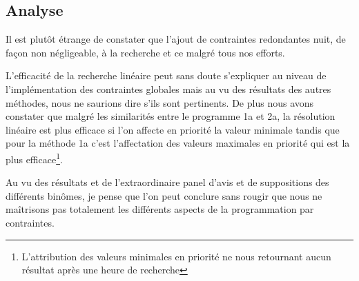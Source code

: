 \documentclass[a4paper, 11pt]{article}
\begin{document}
\subsection{Analyse}
Il est plutôt étrange de constater que l'ajout de contraintes redondantes nuit, de façon non négligeable, à la recherche et ce malgré tous nos efforts.

L'efficacité de la recherche linéaire peut sans doute s'expliquer au niveau de l'implémentation des contraintes globales mais au vu des résultats des autres méthodes, nous ne saurions dire s'ils sont pertinents. De plus nous avons constater que malgré les similarités entre le programme 1a et 2a, la résolution linéaire est plus efficace si l'on affecte en priorité la valeur minimale tandis que pour la méthode 1a c'est l'affectation des valeurs maximales en priorité qui est la plus efficace\footnote{L'attribution des valeurs minimales en priorité ne nous retournant aucun résultat après une heure de recherche}. 


Au vu des résultats et de l'extraordinaire panel d'avis et de suppositions des différents binômes, je pense que l'on peut conclure sans rougir que nous ne maîtrisons pas totalement les différents aspects de la programmation par contraintes.
\end{document}
